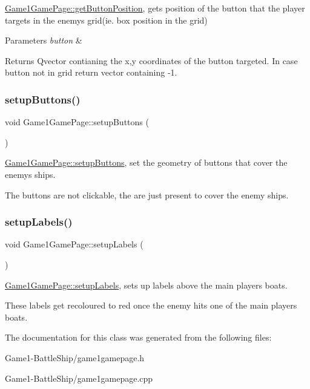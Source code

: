 \hyperlink{classGame1GamePage_a47232d81c8e7f96bbf70a16821f86157}{Game1\+Game\+Page\+::get\+Button\+Position}, gets position of the button that the player targets in the enemy\textquotesingle{}s grid(ie. box position in the grid) 


\begin{DoxyParams}{Parameters}
{\em button} & \\
\hline
\end{DoxyParams}
\begin{DoxyReturn}{Returns}
Qvector contianing the x,y coordinates of the button targeted. In case button not in grid return vector containing -\/1. 
\end{DoxyReturn}
\mbox{\label{classGame1GamePage_a55c34bef7d0cb08a617aba01ad556c8c}} 
\subsubsection{\texorpdfstring{setup\+Buttons()}{setupButtons()}}
{\footnotesize\ttfamily void Game1\+Game\+Page\+::setup\+Buttons (\begin{DoxyParamCaption}{ }\end{DoxyParamCaption})}



\hyperlink{classGame1GamePage_a55c34bef7d0cb08a617aba01ad556c8c}{Game1\+Game\+Page\+::setup\+Buttons}, set the geometry of buttons that cover the enemy\textquotesingle{}s ships. 

The buttons are not clickable, the are just present to cover the enemy ships.\mbox{\label{classGame1GamePage_a071eb05d04c53abb1f82fe66ad656040}} 
\subsubsection{\texorpdfstring{setup\+Labels()}{setupLabels()}}
{\footnotesize\ttfamily void Game1\+Game\+Page\+::setup\+Labels (\begin{DoxyParamCaption}{ }\end{DoxyParamCaption})}



\hyperlink{classGame1GamePage_a071eb05d04c53abb1f82fe66ad656040}{Game1\+Game\+Page\+::setup\+Labels}, sets up labels above the main players boats. 

These labels get recoloured to red once the enemy hits one of the main player\textquotesingle{}s boats. 

The documentation for this class was generated from the following files\+:\begin{DoxyCompactItemize}
\item 
Game1-\/\+Battle\+Ship/game1gamepage.\+h\item 
Game1-\/\+Battle\+Ship/game1gamepage.\+cpp\end{DoxyCompactItemize}
